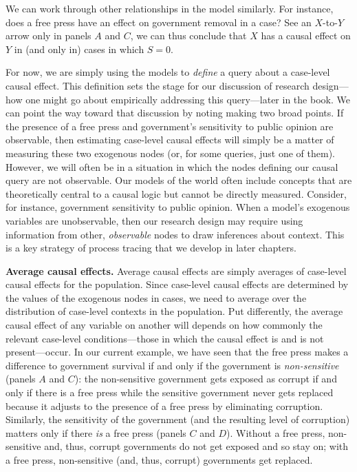 \documentclass[12pt,]{book}
\begin{document}
We can work through other relationships in the model similarly. For instance, does a free press have an effect on government removal in a case? See an \(X\)-to-\(Y\) arrow only in panels \(A\) and \(C\), we can thus conclude that \(X\) has a causal effect on \(Y\) in (and only in) cases in which \(S=0\).

For now, we are simply using the models to \emph{define} a query about a case-level causal effect. This definition sets the stage for our discussion of research design---how one might go about empirically addressing this query---later in the book. We can point the way toward that discussion by noting making two broad points. If the presence of a free press and government's sensitivity to public opinion are observable, then estimating case-level causal effects will simply be a matter of measuring these two exogenous nodes (or, for some queries, just one of them). However, we will often be in a situation in which the nodes defining our causal query are not observable. Our models of the world often include concepts that are theoretically central to a causal logic but cannot be directly measured. Consider, for instance, government sensitivity to public opinion. When a model's exogenous variables are unobservable, then our research design may require using information from other, \emph{observable} nodes to draw inferences about context. This is a key strategy of process tracing that we develop in later chapters.

\textbf{Average causal effects.} Average causal effects are simply averages of case-level causal effects for the population. Since case-level causal effects are determined by the values of the exogenous nodes in cases, we need to average over the distribution of case-level contexts in the population. Put differently, the average causal effect of any variable on another will depends on how commonly the relevant case-level conditions---those in which the causal effect is and is not present---occur. In our current example, we have seen that the free press makes a difference to government survival if and only if the government is \emph{non-sensitive} (panels \(A\) and \(C\)): the non-sensitive government gets exposed as corrupt if and only if there is a free press while the sensitive government never gets replaced because it adjusts to the presence of a free press by eliminating corruption. Similarly, the sensitivity of the government (and the resulting level of corruption) matters only if there \emph{is} a free press (panels \(C\) and \(D\)). Without a free press, non-sensitive and, thus, corrupt governments do not get exposed and so stay on; with a free press, non-sensitive (and, thus, corrupt) governments get replaced.
\end{document}
